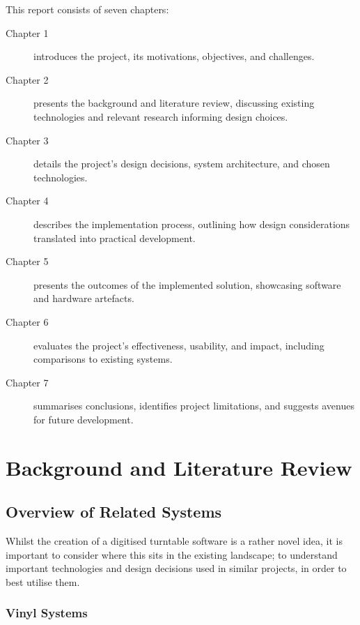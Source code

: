             This report consists of seven chapters:
            \begin{description}
                \item[Chapter 1] introduces the project, its motivations, objectives, and challenges.
                \item[Chapter 2] presents the background and literature review, discussing existing technologies and relevant research informing design choices.
                \item[Chapter 3] details the project's design decisions, system architecture, and chosen technologies.
                \item[Chapter 4] describes the implementation process, outlining how design considerations translated into practical development.
                \item[Chapter 5] presents the outcomes of the implemented solution, showcasing software and hardware artefacts.
                \item[Chapter 6] evaluates the project's effectiveness, usability, and impact, including comparisons to existing systems.
                \item[Chapter 7] summarises conclusions, identifies project limitations, and suggests avenues for future development.
            \end{description}
    
    \section{Background and Literature Review} %
    
      \subsection{Overview of Related Systems}
    
        Whilst the creation of a digitised turntable software is a rather novel idea, it is important to consider where this sits in the existing landscape; to understand important technologies and design decisions used in similar projects, in order to best utilise them.
      
        \subsubsection{Vinyl Systems}
    
